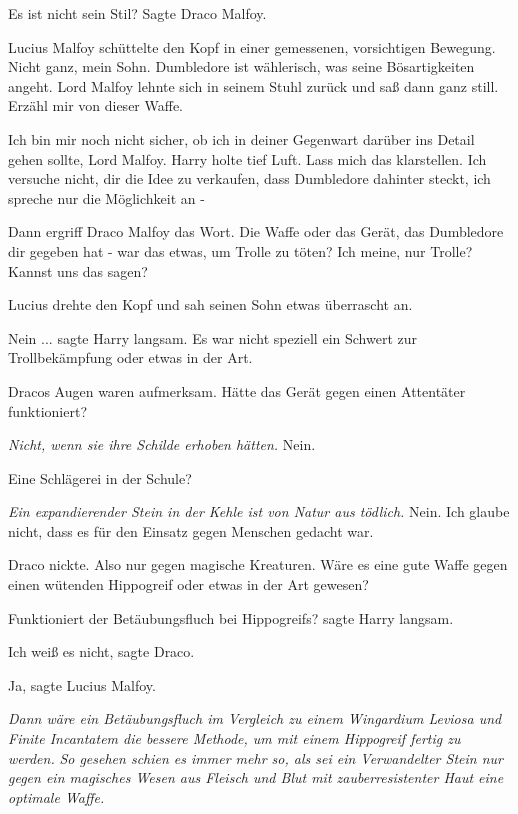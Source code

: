 \glqq{}Es ist nicht sein Stil?\grqq{} Sagte Draco Malfoy.

Lucius Malfoy schüttelte den Kopf in einer gemessenen, vorsichtigen Bewegung.
\glqq{}Nicht ganz, mein Sohn. Dumbledore ist wählerisch, was seine Bösartigkeiten
angeht.\grqq{} Lord Malfoy lehnte sich in seinem Stuhl zurück und saß dann ganz
still. \glqq{}Erzähl mir von dieser Waffe.\grqq{}

\glqq{}Ich bin mir noch nicht sicher, ob ich in deiner Gegenwart darüber ins
Detail gehen sollte, Lord Malfoy.\grqq{} Harry holte tief Luft. \glqq{}Lass mich
das klarstellen. Ich versuche nicht, dir die Idee zu verkaufen, dass Dumbledore
dahinter steckt, ich spreche nur die Möglichkeit an -\grqq{}

Dann ergriff Draco Malfoy das Wort. \glqq{}Die Waffe oder das Gerät, das
Dumbledore dir gegeben hat - war das etwas, um Trolle zu töten? Ich meine, nur
Trolle? Kannst uns das sagen?\grqq{}

Lucius drehte den Kopf und sah seinen Sohn etwas überrascht an.

\glqq{}Nein ...\grqq{} sagte Harry langsam. \glqq{}Es war nicht speziell ein
Schwert zur Trollbekämpfung oder etwas in der Art.\grqq{}

Dracos Augen waren aufmerksam. \glqq{}Hätte das Gerät gegen einen Attentäter
funktioniert?\grqq{}

\emph{Nicht, wenn sie ihre Schilde erhoben hätten.}
\glqq{}Nein.\grqq{}

\glqq{}Eine Schlägerei in der Schule?\grqq{}

\emph{Ein expandierender Stein in der Kehle ist von Natur aus tödlich.}
\glqq{}Nein. Ich glaube nicht, dass es für den Einsatz gegen Menschen gedacht
war.\grqq{}

Draco nickte. \glqq{}Also nur gegen magische Kreaturen. Wäre es eine gute Waffe
gegen einen wütenden Hippogreif oder etwas in der Art gewesen?\grqq{}

\glqq{}Funktioniert der Betäubungsfluch bei Hippogreifs?\grqq{} sagte Harry
langsam.

\glqq{}Ich weiß es nicht\grqq{}, sagte Draco.

\glqq{}Ja\grqq{}, sagte Lucius Malfoy.

\emph{Dann wäre ein Betäubungsfluch im Vergleich zu einem Wingardium Leviosa und
Finite Incantatem die bessere Methode, um mit einem Hippogreif fertig zu
werden.} \emph{So gesehen schien es immer mehr so, als sei ein Verwandelter
Stein nur gegen ein magisches Wesen aus Fleisch und Blut mit zauberresistenter
Haut eine optimale Waffe.}

